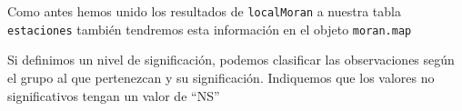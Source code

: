 \documentclass[
  letterpaper,
  DIV=11,
  numbers=noendperiod]{scrreprt}
\newenvironment{Shaded}{\begin{snugshade}}{\end{snugshade}}
\newcommand{\CommentTok}[1]{\textcolor[rgb]{0.37,0.37,0.37}{#1}}
\newcommand{\FloatTok}[1]{\textcolor[rgb]{0.68,0.00,0.00}{#1}}
\newcommand{\FunctionTok}[1]{\textcolor[rgb]{0.28,0.35,0.67}{#1}}
\newcommand{\NormalTok}[1]{\textcolor[rgb]{0.00,0.23,0.31}{#1}}
\newcommand{\OtherTok}[1]{\textcolor[rgb]{0.00,0.23,0.31}{#1}}
\newcommand{\SpecialCharTok}[1]{\textcolor[rgb]{0.37,0.37,0.37}{#1}}
\newcommand{\StringTok}[1]{\textcolor[rgb]{0.13,0.47,0.30}{#1}}
\begin{document}
Como antes hemos unido los resultados de \texttt{localMoran} a nuestra
tabla \texttt{estaciones} también tendremos esta información en el
objeto \texttt{moran.map}

Si definimos un nivel de significación, podemos clasificar las
observaciones según el grupo al que pertenezcan y su significación.
Indiquemos que los valores no significativos tengan un valor de ``NS''

\begin{Shaded}
\end{Shaded}
\end{document}
